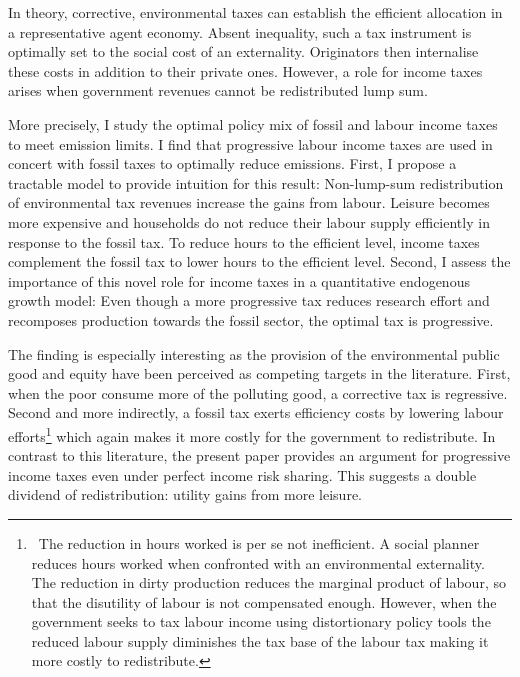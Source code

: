 In theory, corrective, environmental taxes can establish the efficient allocation in a representative agent economy. Absent inequality, such a tax instrument is optimally set to the social cost of an externality. Originators then internalise these costs in addition to their private ones. However, a role for income taxes arises when government revenues cannot be redistributed lump sum.

More precisely, I study the optimal policy mix of fossil and labour income taxes to meet emission limits. 
I find that progressive labour income taxes are used in concert with fossil taxes to optimally reduce emissions. 
 First, I propose a tractable model to provide intuition for this result: Non-lump-sum redistribution of environmental tax revenues increase the gains from labour. Leisure becomes more expensive and households do not reduce their labour supply efficiently in response to the fossil tax. To reduce hours to the efficient level, income taxes complement the fossil tax to lower hours to the efficient level.  
Second, I assess the importance of this novel role for income taxes in a quantitative endogenous growth model:
Even though a more progressive tax reduces research effort  and recomposes production towards the fossil sector, the optimal tax is progressive. 

The finding is especially interesting as the provision of the environmental public good and equity have been perceived as competing targets in the literature. First, when the poor consume more of the polluting good, a corrective tax is regressive. Second and more indirectly, a fossil tax exerts efficiency costs by lowering labour efforts\footnote{\ The reduction in hours worked is per se not inefficient. A social planner reduces hours worked when confronted with an environmental externality. The reduction in dirty production reduces the marginal product of labour, so that the disutility of labour is not compensated enough. However, when the government seeks to tax labour income using distortionary policy tools the reduced labour supply diminishes the tax base of the labour tax making it more costly to redistribute.} which again makes it more costly for the government to redistribute. 
In contrast to this literature, the present paper provides an argument for progressive income taxes even under perfect income risk sharing. This suggests a double dividend of redistribution: utility gains from more leisure.

